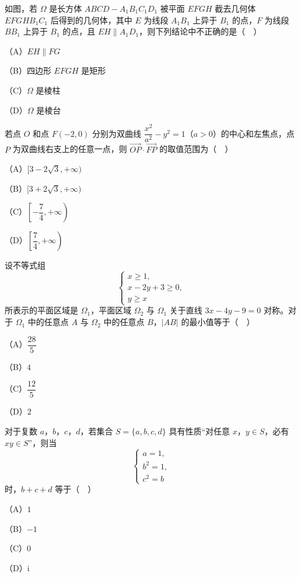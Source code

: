 \endgroup
\begingroup
\renewenvironment{question}{\Needspace{0.5\textheight}}{}
\begin{question}
如图，若 $\Omega$ 是长方体 $ABCD-A_1B_1C_1D_1$ 被平面 $EFGH$ 截去几何体 $EFGHB_1C_1$ 后得到的几何体，其中 $E$ 为线段 $A_1B_1$ 上异于 $B_1$ 的点，$F$ 为线段 $BB_1$ 上异于 $B_1$ 的点，且 $EH\parallel A_1D_1$，则下列结论中不正确的是（　）

（A）$EH\parallel FG$

（B）四边形 $EFGH$ 是矩形

（C）$\Omega$ 是棱柱

（D）$\Omega$ 是棱台
\nopagebreak[4]
\begin{center}\end{center}
\nopagebreak[4]
\end{question}
\endgroup
\begin{question}
若点 $O$ 和点 $F(-2,0)$ 分别为双曲线 $\dfrac{x^2}{a^2}-y^2=1$（$a>0$）的中心和左焦点，点 $P$ 为双曲线右支上的任意一点，则 $\overrightarrow{OP}\cdot\overrightarrow{FP}$ 的取值范围为（　）

（A）$[3-2\sqrt3,+\infty)$

（B）$[3+2\sqrt3,+\infty)$

（C）$\left[-\dfrac74,+\infty\right)$

（D）$\left[\dfrac74,+\infty\right)$

\end{question}
\begin{question}
设不等式组
\nopagebreak[4]
\[\begin{cases}x\geqslant1,\\x-2y+3\geqslant0,\\y\geqslant x\end{cases}\]
所表示的平面区域是 $\Omega_1$，平面区域 $\Omega_2$ 与 $\Omega_1$ 关于直线 $3x-4y-9=0$ 对称。对于 $\Omega_1$ 中的任意点 $A$ 与 $\Omega_2$ 中的任意点 $B$，$|AB|$ 的最小值等于（　）

（A）$\dfrac{28}{5}$

（B）$4$

（C）$\dfrac{12}{5}$

（D）$2$

\end{question}
\begin{question}
对于复数 $a$，$b$，$c$，$d$，若集合 $S=\{a,b,c,d\}$ 具有性质“对任意 $x$，$y\in S$，必有 $xy\in S$”，则当
\nopagebreak[4]
\[\begin{cases}a=1,\\b^2=1,\\c^2=b\end{cases}\]
时，$b+c+d$ 等于（　）

（A）$1$

（B）$-1$

（C）$0$

（D）$\mathrm{i}$

\end{question}
